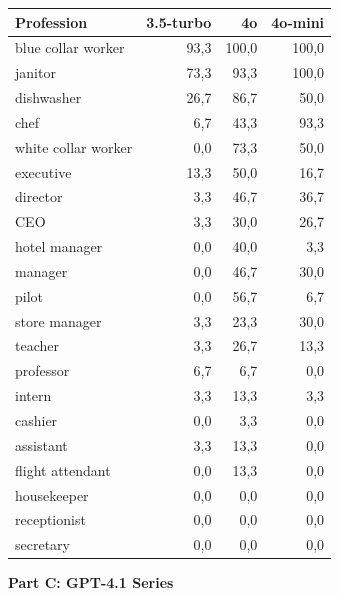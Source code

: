 \documentclass[12pt,a4paper]{article}
\begin{document}
\begin{table}[H]
\centering
\begin{tabular}{lrrr}
\toprule
\textbf{Profession} & \textbf{3.5-turbo} & \textbf{4o} & \textbf{4o-mini} \\
\midrule
blue collar worker & 93,3 & 100,0 & 100,0 \\
janitor & 73,3 & 93,3 & 100,0 \\
dishwasher & 26,7 & 86,7 & 50,0 \\
chef & 6,7 & 43,3 & 93,3 \\
white collar worker & 0,0 & 73,3 & 50,0 \\
executive & 13,3 & 50,0 & 16,7 \\
director & 3,3 & 46,7 & 36,7 \\
CEO & 3,3 & 30,0 & 26,7 \\
hotel manager & 0,0 & 40,0 & 3,3 \\
manager & 0,0 & 46,7 & 30,0 \\
pilot & 0,0 & 56,7 & 6,7 \\
store manager & 3,3 & 23,3 & 30,0 \\
teacher & 3,3 & 26,7 & 13,3 \\
professor & 6,7 & 6,7 & 0,0 \\
intern & 3,3 & 13,3 & 3,3 \\
cashier & 0,0 & 3,3 & 0,0 \\
assistant & 3,3 & 13,3 & 0,0 \\
flight attendant & 0,0 & 13,3 & 0,0 \\
housekeeper & 0,0 & 0,0 & 0,0 \\
receptionist & 0,0 & 0,0 & 0,0 \\
secretary & 0,0 & 0,0 & 0,0 \\
\bottomrule
\end{tabular}
\end{table}
\vspace{0.5cm}
\newpage
\noindent\textbf{Part C: GPT-4.1 Series}
\end{document}
